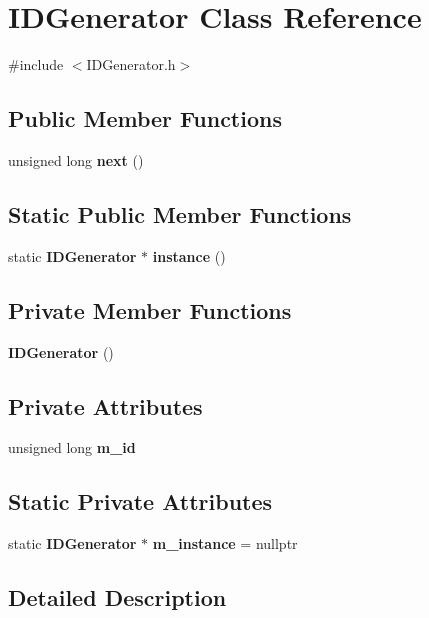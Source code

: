 \section{I\+D\+Generator Class Reference}
\label{class_i_d_generator}


{\ttfamily \#include $<$I\+D\+Generator.\+h$>$}

\subsection*{Public Member Functions}
\begin{DoxyCompactItemize}
\item 
unsigned long \textbf{ next} ()
\end{DoxyCompactItemize}
\subsection*{Static Public Member Functions}
\begin{DoxyCompactItemize}
\item 
static \textbf{ I\+D\+Generator} $\ast$ \textbf{ instance} ()
\end{DoxyCompactItemize}
\subsection*{Private Member Functions}
\begin{DoxyCompactItemize}
\item 
\textbf{ I\+D\+Generator} ()
\end{DoxyCompactItemize}
\subsection*{Private Attributes}
\begin{DoxyCompactItemize}
\item 
unsigned long \textbf{ m\+\_\+id}
\end{DoxyCompactItemize}
\subsection*{Static Private Attributes}
\begin{DoxyCompactItemize}
\item 
static \textbf{ I\+D\+Generator} $\ast$ \textbf{ m\+\_\+instance} = nullptr
\end{DoxyCompactItemize}


\subsection{Detailed Description}



